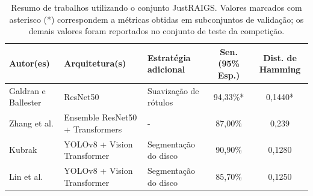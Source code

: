 \documentclass[12pt]{article}
\begin{document}
\begin{table}[h]
    \centering
    \scriptsize
    \renewcommand{\arraystretch}{1.5}
    \begin{tabularx}{\textwidth}{p{2.5cm}p{3cm}lcc}
    \toprule
    \textbf{Autor(es)} & \textbf{Arquitetura(s)} & \textbf{Estratégia adicional} & \textbf{Sen. (95\% Esp.)} & \textbf{Dist. de Hamming} \\
    \midrule
    Galdran e Ballester \cite{justraigs_galdran} & ResNet50 & Suavização de rótulos & 94,33\%* & 0,1440* \\

    Zhang et al. \cite{justraigs_zhang} & Ensemble ResNet50 + Transformers & - & 87,00\% & 0,239 \\

    Kubrak \cite{justraigs_kubrak} & YOLOv8 + Vision Transformer & Segmentação do disco & 90,90\% & 0,1280 \\

    Lin et al. \cite{justraigs_hu_lin} & YOLOv8 + Vision Transformer & Segmentação do disco & 85,70\% & 0,1250 \\
    \bottomrule
    \end{tabularx}
    \renewcommand{\arraystretch}{1}
    \caption{Resumo de trabalhos utilizando o conjunto JustRAIGS. Valores marcados com asterisco (*) correspondem a métricas obtidas em subconjuntos de validação; os demais valores foram reportados no conjunto de teste da competição.}
    \label{tab:justraigs_work}
\end{table}










\end{document}
